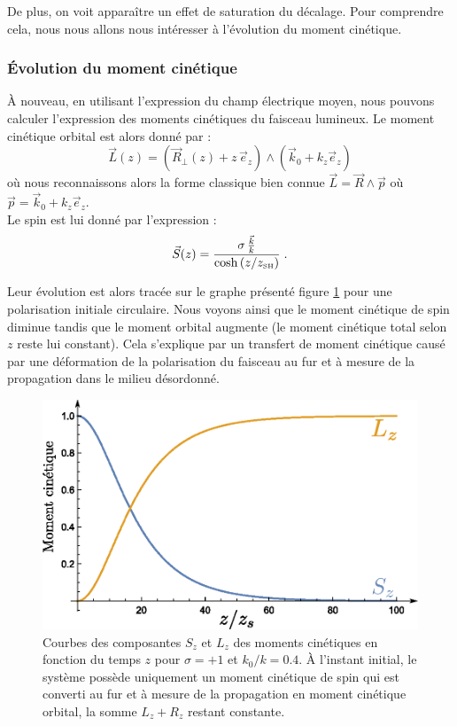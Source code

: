\documentclass[a4paper,11pt]{article} %
\begin{document}
	De plus, on voit apparaître un effet de saturation du décalage. Pour comprendre cela, nous nous allons nous intéresser à l'évolution du moment cinétique.
	
	
	\subsubsection{\'Evolution du moment cinétique}
	\`A nouveau, en utilisant l'expression du champ électrique moyen, nous pouvons calculer l'expression des moments cinétiques du faisceau lumineux. Le moment cinétique orbital est alors donné par :
	\begin{equation*}
		\label{exp_L(z)}
		\vec{L}(z) = \left(\vec{R}_\perp(z) + z \, \vec{e}_z \right) \wedge ( \vec{k}_0 + k_z \vec{e}_z ) 
	\end{equation*}
	où nous reconnaissons alors la forme classique bien connue $ \vec{L} = \vec{R} \wedge \vec{p} $ où $ \vec{p} = \vec{k}_0 + k_z \vec{e}_z $.\\
	
	Le spin est lui donné par l'expression :
	\begin{equation}
		\label{exp_S(z)}
		\vec{S}(z) =  \frac{ \sigma \, \frac{\vec{k}}{k} }{ \cosh \left( z/z_\text{{\tiny SH}} \right) } \; .
	\end{equation}
	
	Leur évolution est alors tracée sur le graphe présenté figure \ref{fig:conversion_moment_cinetique} pour une polarisation initiale circulaire. Nous voyons ainsi que le moment cinétique de spin diminue tandis que le moment orbital augmente (le moment cinétique total selon $ z $ reste lui constant). Cela s'explique par un transfert de moment cinétique causé par une déformation de la polarisation du faisceau au fur et à mesure de la propagation dans le milieu désordonné.
	
	\begin{figure}[h]
		\centering
		\begin{minipage}[c]{0.85\linewidth}
			\centering
			\includegraphics[width=0.7\linewidth]{./Illustrations/Plot_conversion_L-S.eps}
			\caption{Courbes des composantes $ S_z $ et $ L_z $ des moments cinétiques en fonction du temps $ z $ pour $ \sigma = + 1 $ et $ k_0 / k = 0.4 $. \`{A} l'instant initial, le système possède uniquement un moment cinétique de spin qui est converti au fur et à mesure de la propagation en moment cinétique orbital, la somme $ L_z + R_z $ restant constante.}
			\label{fig:conversion_moment_cinetique}
		\end{minipage}
	\end{figure}
	
\end{document}

